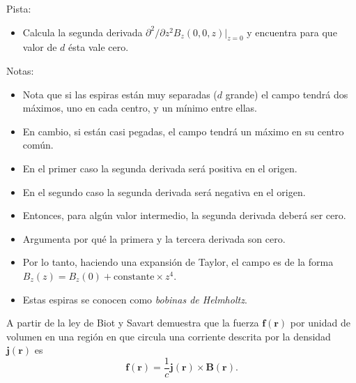 \documentclass{exam}
\begin{document}
\begin{questions}
    Pista:
    \begin{itemize}
    \item Calcula la segunda derivada $\partial^2/\partial z^2
      B_z(0,0,z)|_{z=0}$ y encuentra para que valor de $d$ ésta vale
      cero.
    \end{itemize}
    Notas:
    \begin{itemize}
    \item Nota que si las espiras están muy separadas ($d$ grande) el campo tendrá
      dos máximos, uno en cada centro, y un mínimo entre ellas.
    \item En cambio, si están casi pegadas, el campo tendrá un máximo
      en su centro común.
    \item En el primer caso la segunda derivada será positiva en el
      origen.
    \item En el segundo caso la segunda derivada será negativa en el
      origen.
    \item Entonces, para algún valor intermedio, la segunda derivada deberá ser
      cero.
    \item Argumenta por qué la primera y la tercera derivada son cero.
    \item Por lo tanto, haciendo una expansión de Taylor, el campo es de la forma
      $B_z(z)=B_z(0)+\mathrm{constante}\times z^4$.
    \item Estas espiras se conocen como {\em bobinas de Helmholtz}.
    \end{itemize}
  \question A partir de la ley de Biot y Savart demuestra que la
    fuerza $\bm f(\bm r)$ por unidad de volumen en una región en que
    circula una corriente descrita por la densidad $\bm j(\bm r)$ es
    $$
    \bm f(\bm r)=\frac{1}{c}\bm j(\bm r)\times \bm B(\bm r).
    $$


\end{questions}
\end{document}
